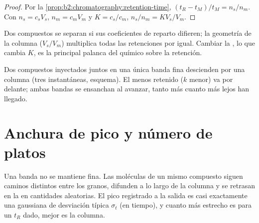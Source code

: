 \begin{proof}
Por la \cref{prop:b2:chromatography:retention-time}, $(t_R - t_M)/t_M = n_s/n_m$. Con $n_s = c_sV_s$,
$n_m = c_mV_m$ y $K = c_s/c_m$, $n_s/n_m = KV_s/V_m$.
\end{proof}

Dos compuestos se separan si sus coeficientes de reparto difieren; la geometría de la columna ($V_s/V_m$)
multiplica todas las retenciones por igual. Cambiar la , lo que cambia $K$, es la principal
palanca del químico sobre la retención.

\begin{omfigure}
\par\vspace{4pt}

{\small Dos compuestos inyectados juntos en una única banda fina descienden por una columna (tres instantáneas,
esquema). El menos retenido ($k$ menor) va por delante; ambas bandas se ensanchan al avanzar, tanto más
cuanto más lejos han llegado.}
\end{omfigure}

\section{Anchura de pico y número de platos}

Una banda no se mantiene fina. Las moléculas de un mismo compuesto siguen caminos distintos entre los granos,
difunden a lo largo de la columna y se retrasan en la  en cantidades aleatorias. El pico registrado a
la salida es casi exactamente una gaussiana de desviación típica $\sigma_t$ (en tiempo), y cuanto más estrecho es
para un $t_R$ dado, mejor es la columna.

